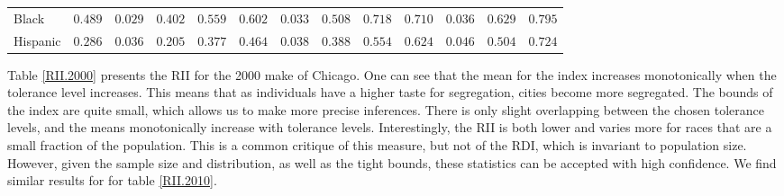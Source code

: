 {\begin{table}[h!]
{\begin{tabular}{lllllllllllll}
\multicolumn{1}{l|}{Black}    & $0.489$ & $0.029$ & $0.402$ & \multicolumn{1}{l|}{$0.559$} & $0.602$ & $0.033$ & $0.508$ & \multicolumn{1}{l|}{$0.718$} & $0.710$ & $0.036$ & $0.629$ & $0.795$ \\
\multicolumn{1}{l|}{Hispanic} & $0.286$ & $0.036$ & $0.205$ & \multicolumn{1}{l|}{$0.377$} & $0.464$ & $0.038$ & $0.388$ & \multicolumn{1}{l|}{$0.554$} & $0.624$ & $0.046$ & $0.504$ & $0.724$ \\ \hline \hline
\end{tabular}
}
\end{table}

Table \ref{RII.2000} presents the RII for the 2000 make of Chicago. One can see that the mean for the index increases monotonically when the tolerance level increases. This means that as individuals have a higher taste for segregation, cities become more segregated. The bounds of the index are quite small, which allows us to make more precise inferences. There is only slight overlapping between the chosen tolerance levels, and the means monotonically increase with tolerance levels. Interestingly, the RII is both lower and varies more for races that are a small fraction of the population. This is a common critique of this measure, but not of the RDI, which is invariant to population size. However, given the sample size and distribution, as well as the tight bounds, these statistics can be accepted with high confidence. We find similar results for for table \ref{RII.2010}.

}
